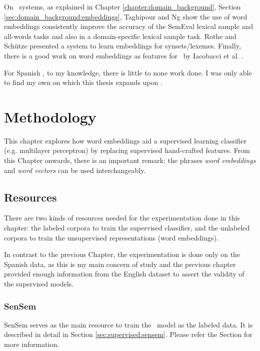 On \wsd~systems, as explained in Chapter \ref{chapter:domain_background},
Section \ref{sec:domain_background:embeddings}, Taghipour and Ng
\cite{Taghipour2015SemiSupervisedWS} show the use of word embeddings
consistently improve the accuracy of the SemEval lexical sample and all-words
tasks and also in a domain-specific lexical sample task. Rothe and Sch\"utze
\cite{rothe-schutze:2015:ACL-IJCNLP} presented a system to learn embeddings for
synsets/lexemes. Finally, there is a good work on word embeddings as features
for \wsd~by Iacobacci et al. \cite{iacobacci-pilehvar-navigli:2016:P16-1}.

For Spanish \wsd, to my knowledge, there is little to none work done. I was
only able to find my own on which this thesis expands upon
\cite{cardellinodisjoint}.

\section{Methodology}\label{sec:embeddings:methodology}

This chapter explores how word embeddings aid a supervised learning classifier
(e.g. multilayer perceptron) by replacing supervised hand-crafted features.
From this Chapter onwards, there is an important remark: the phrases {\em word
embeddings} and {\em word vectors} can be used interchangeably.

\subsection{Resources}\label{sec:embeddings:resources}

There are two kinds of resources needed for the experimentation done in this
chapter: the labeled corpora to train the supervised classifier, and the
unlabeled corpora to train the unsupervised representations (word embeddings).

In contrast to the previous Chapter, the experimentation is done only on the
Spanish data, as this is my main concern of study and the previous chapter
provided enough information from the English dataset to assert the validity of
the supervised models.

\subsubsection{SenSem}

SenSem serves as the main resource to train the \vsd~model as the labeled
data. It is described in detail in Section \ref{sec:supervised:sensem}. Please
refer the Section for more information.

